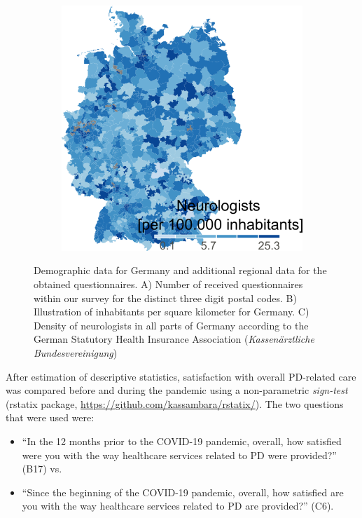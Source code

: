 \documentclass[a4paper,oneside,11pt,english]{scrartcl}
\begin{document}
\begin{figure}[h!]
\begin{subfigure}[b]{0.35\linewidth}
		\label{fig1:population}
	\end{subfigure}%
	\begin{subfigure}[b]{0.35\linewidth}
		\includegraphics[width=.90\textwidth]{fig1c.neurologist_density.v1.0.png}
		\label{fig1:neurologists}
	\end{subfigure}%
	\caption{Demographic data for Germany and additional regional data for the obtained questionnaires. A) Number of received questionnaires within our survey for the distinct three digit postal codes. B) Illustration of inhabitants per square kilometer for Germany. C) Density of neurologists in all parts of Germany according to the German Statutory Health Insurance Association (\textit{Kassenärztliche Bundesvereinigung})}
	\label{fig1:total}
\end{figure}

After estimation of descriptive statistics, satisfaction with overall \textsc{PD}-related care was compared before and during the pandemic using a non-parametric \textit{sign-test} (rstatix package, \url{https://github.com/kassambara/rstatix/}). The two questions that were used were: 
\begin{itemize}
	\item ``In the 12 months prior to the  \textsc{COVID}-19 pandemic, overall, how satisfied were you with the way healthcare services related to \textsc{PD} were provided?'' (B17) vs.
	\item ``Since the beginning of the \textsc{COVID}-19 pandemic, overall, how satisfied are you with the way healthcare services related to \textsc{PD} are provided?'' (C6).
\end{itemize}
\end{document}
